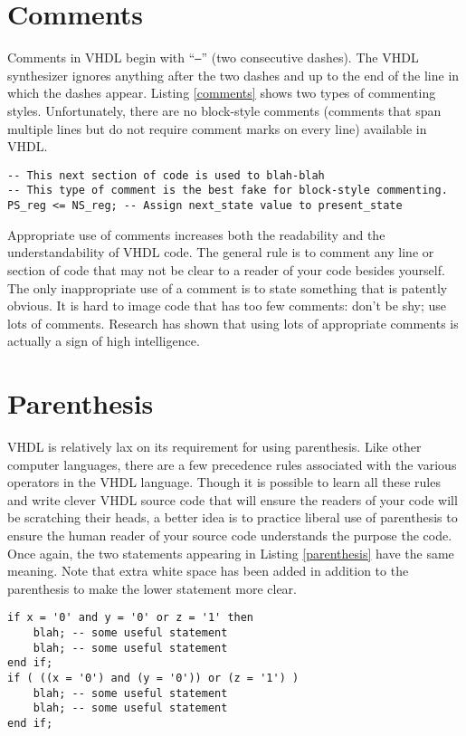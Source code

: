 \section{Comments}
Comments in VHDL begin with ``\texttt{--}'' (two consecutive dashes). The VHDL synthesizer ignores anything after the two dashes and up to the end of the line in which the dashes appear. Listing \ref{comments} shows two types of commenting styles. Unfortunately, there are no block-style comments (comments that span multiple lines but do not require comment marks on every line) available in VHDL.
\begin{lstlisting}[label=comments, caption=Two typical uses of comments.]
-- This next section of code is used to blah-blah
-- This type of comment is the best fake for block-style commenting.
PS_reg <= NS_reg; -- Assign next_state value to present_state
\end{lstlisting}
Appropriate use of comments increases both the readability and the understandability of VHDL code. The general rule is to comment any line or section of code that may not be clear to a reader of your code besides yourself. The only inappropriate use of a comment is to state something that is patently obvious. It is hard to image code that has too few comments: don't be shy; use lots of comments. Research has shown that using lots of appropriate comments is actually a sign of high intelligence.

\section{Parenthesis}
VHDL is relatively lax on its requirement for using parenthesis. Like other computer languages, there are a few precedence rules associated with the various operators in the VHDL language. Though it is possible to learn all these rules and write clever VHDL source code that will ensure the readers of your code will be scratching their heads, a better idea is to practice liberal use of parenthesis to ensure the human reader of your source code understands the purpose the code. Once again, the two statements appearing in Listing \ref{parenthesis} have the same meaning. Note that extra white space has been added in addition to the parenthesis to make the lower statement more clear. 
\begin{lstlisting}[label=parenthesis, caption=Example of parenthesis that can improve clarity.]
if x = '0' and y = '0' or z = '1' then
	blah; -- some useful statement
	blah; -- some useful statement
end if;
if ( ((x = '0') and (y = '0')) or (z = '1') )
	blah; -- some useful statement
	blah; -- some useful statement
end if;
\end{lstlisting}

